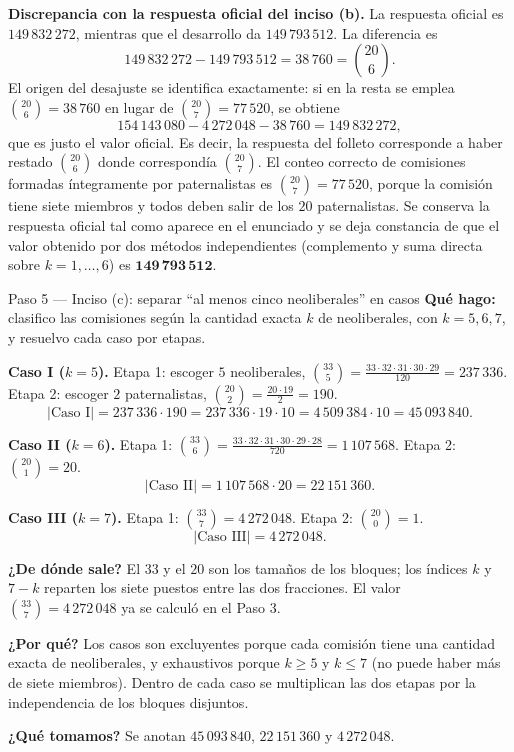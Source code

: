\documentclass[11pt]{article}
\begin{document}
\begin{nota}
\textbf{Discrepancia con la respuesta oficial del inciso (b).} La respuesta oficial es $149\,832\,272$, mientras que el desarrollo da $149\,793\,512$. La diferencia es
\[
  149\,832\,272 - 149\,793\,512 = 38\,760 = \binom{20}{6} .
\]
El origen del desajuste se identifica exactamente: si en la resta se emplea $\binom{20}{6}=38\,760$ en lugar de $\binom{20}{7}=77\,520$, se obtiene
\[
  154\,143\,080 - 4\,272\,048 - 38\,760 = 149\,832\,272 ,
\]
que es justo el valor oficial. Es decir, la respuesta del folleto corresponde a haber restado $\binom{20}{6}$ donde correspondía $\binom{20}{7}$. El conteo correcto de comisiones formadas íntegramente por paternalistas es $\binom{20}{7}=77\,520$, porque la comisión tiene siete miembros y todos deben salir de los $20$ paternalistas. Se conserva la respuesta oficial tal como aparece en el enunciado y se deja constancia de que el valor obtenido por dos métodos independientes (complemento y suma directa sobre $k=1,\dots,6$) es $\mathbf{149\,793\,512}$.
\end{nota}

\begin{paso}{Paso 5 --- Inciso (c): separar ``al menos cinco neoliberales'' en casos}
\textbf{Qué hago:} clasifico las comisiones según la cantidad exacta $k$ de neoliberales, con $k=5,6,7$, y resuelvo cada caso por etapas.

\medskip
\textbf{Caso I ($k=5$).} Etapa 1: escoger $5$ neoliberales, $\binom{33}{5}=\frac{33\cdot 32\cdot 31\cdot 30\cdot 29}{120}=237\,336$. Etapa 2: escoger $2$ paternalistas, $\binom{20}{2}=\frac{20\cdot 19}{2}=190$.
\[
  |\text{Caso I}| = 237\,336\cdot 190 = 237\,336\cdot 19\cdot 10 = 4\,509\,384\cdot 10 = 45\,093\,840 .
\]

\textbf{Caso II ($k=6$).} Etapa 1: $\binom{33}{6}=\frac{33\cdot 32\cdot 31\cdot 30\cdot 29\cdot 28}{720}=1\,107\,568$. Etapa 2: $\binom{20}{1}=20$.
\[
  |\text{Caso II}| = 1\,107\,568\cdot 20 = 22\,151\,360 .
\]

\textbf{Caso III ($k=7$).} Etapa 1: $\binom{33}{7}=4\,272\,048$. Etapa 2: $\binom{20}{0}=1$.
\[
  |\text{Caso III}| = 4\,272\,048 .
\]

\textbf{¿De dónde sale?} El $33$ y el $20$ son los tamaños de los bloques; los índices $k$ y $7-k$ reparten los siete puestos entre las dos fracciones. El valor $\binom{33}{7}=4\,272\,048$ ya se calculó en el Paso 3.

\textbf{¿Por qué?} Los casos son excluyentes porque cada comisión tiene una cantidad exacta de neoliberales, y exhaustivos porque $k\ge 5$ y $k\le 7$ (no puede haber más de siete miembros). Dentro de cada caso se multiplican las dos etapas por la independencia de los bloques disjuntos.

\textbf{¿Qué tomamos?} Se anotan $45\,093\,840$, $22\,151\,360$ y $4\,272\,048$.
\end{paso}
\end{document}
